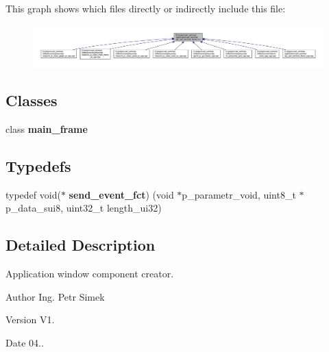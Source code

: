 This graph shows which files directly or indirectly include this file\+:
\nopagebreak
\begin{figure}[H]
\begin{center}
\leavevmode
\includegraphics[width=350pt]{ap__uart__terminal__frame__h_8h__dep__incl}
\end{center}
\end{figure}
\subsection*{Classes}
\begin{DoxyCompactItemize}
\item 
class \textbf{ main\+\_\+frame}
\end{DoxyCompactItemize}
\subsection*{Typedefs}
\begin{DoxyCompactItemize}
\item 
typedef void($\ast$ \textbf{ send\+\_\+event\+\_\+fct}) (void $\ast$p\+\_\+parametr\+\_\+void, uint8\+\_\+t $\ast$p\+\_\+data\+\_\+sui8, uint32\+\_\+t length\+\_\+ui32)
\end{DoxyCompactItemize}


\subsection{Detailed Description}
Application window component creator. 

\begin{DoxyAuthor}{Author}
Ing. Petr Simek 
\end{DoxyAuthor}
\begin{DoxyVersion}{Version}
V1. 
\end{DoxyVersion}
\begin{DoxyDate}{Date}
04.. 
\end{DoxyDate}
